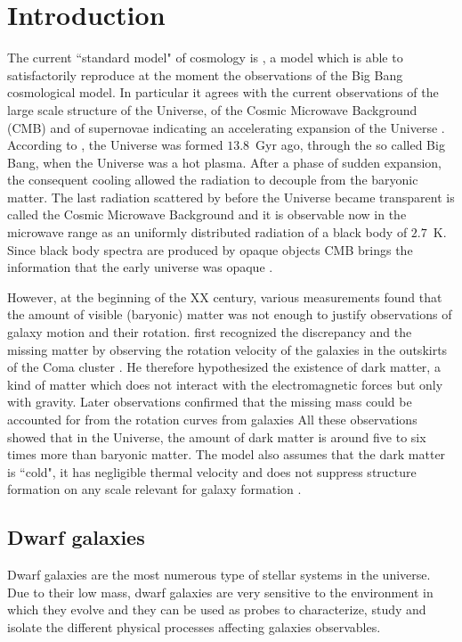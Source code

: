 
\chapter{Introduction}
\label{ch:introduction}

The current ``standard model" of cosmology is \lcdm{}, a model which is able to satisfactorily reproduce at the moment the observations of the Big Bang cosmological model.
In particular it agrees with the current observations of the large scale structure of the Universe, of the Cosmic Microwave Background (CMB) and of supernovae indicating an accelerating expansion of the Universe \citep{Riess1998}.
According to \lcdm{}, the Universe was formed $13.8$~Gyr ago, through the so called Big Bang, when the Universe was a hot plasma.
After a phase of sudden expansion, the consequent cooling allowed the radiation to decouple from the baryonic matter.
The last radiation scattered by before the Universe became transparent is called the Cosmic Microwave Background and it is observable now in the microwave range as an uniformly distributed radiation of a black body of $2.7$~K.
Since black body spectra are produced by opaque objects CMB brings the information that the early universe was opaque \citep{Ryden2003}.



However, at the beginning of the XX century, various measurements found that the amount of visible (baryonic) matter was not enough to justify observations of galaxy motion and their rotation.
\citet{Zwicky1933} first recognized the discrepancy and the missing matter by observing the rotation velocity of the galaxies in the outskirts of the Coma cluster \citep{Zwicky1937}.
He therefore hypothesized the existence of dark matter, a kind of matter which does not interact with the electromagnetic forces but only with gravity.
Later observations confirmed that the missing mass could be accounted for from the rotation curves from galaxies %
All these observations showed that in the Universe, the amount of dark matter is around five to six times more than baryonic matter.
The \lcdm{} model also assumes that the dark matter is ``cold", \ie{} it has negligible thermal velocity and does not suppress structure formation on any scale relevant for galaxy formation \citep{Bullock2017}.

\section{Dwarf galaxies}
Dwarf galaxies are the most numerous type of stellar systems in the universe.
Due to their low mass, dwarf galaxies are very sensitive to the environment in which they evolve and they can be used as probes to characterize, study and isolate the different physical processes affecting galaxies observables.

